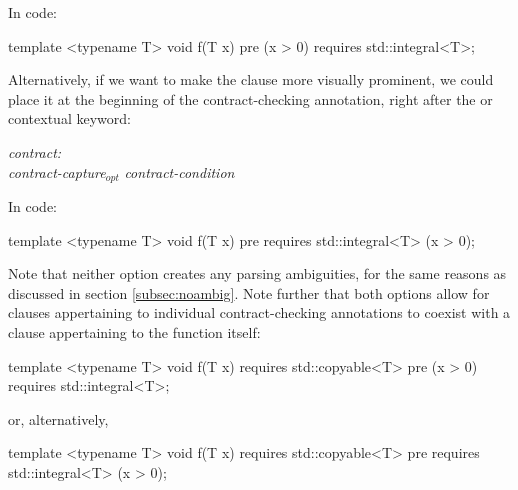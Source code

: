 In code:

\vspace{2mm}
\begin{codeblock}
template <typename T>
void f(T x)
  pre (x > 0) requires std::integral<T>;
\end{codeblock}
\vspace{2mm}

Alternatively, if we want to make the  clause more visually prominent, we could place it at the beginning of the contract-checking annotation, right after the  or  contextual keyword:

\begin{adjustwidth}{0.5cm}{0.5cm}

\emph{contract:} \\
\phantom{~~~} \emph{contract-capture}$_{opt}$ \emph{contract-condition}

\end{adjustwidth}

In code:

\vspace{2mm}
\begin{codeblock}
template <typename T>
void f(T x)
  pre requires std::integral<T> (x > 0);
\end{codeblock}
\vspace{2mm}

Note that neither option creates any parsing ambiguities, for the same reasons as discussed in section \ref{subsec:noambig}. Note further that both options allow for  clauses appertaining to individual contract-checking annotations to coexist with a  clause appertaining to the function itself:

\vspace{2mm}
\begin{codeblock}
template <typename T>
void f(T x)
  requires std::copyable<T>
  pre (x > 0) requires std::integral<T>;
\end{codeblock}
\vspace{2mm}

or, alternatively,

\vspace{2mm}
\begin{codeblock}
template <typename T>
void f(T x)
  requires std::copyable<T>
  pre requires std::integral<T> (x > 0);
\end{codeblock}
\vspace{2mm}

